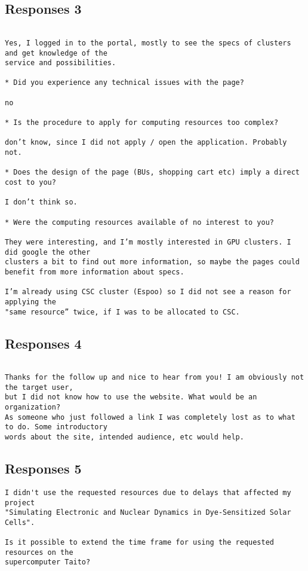 \subsection*{Responses 3}
\begin{verbatim}

Yes, I logged in to the portal, mostly to see the specs of clusters and get knowledge of the 
service and possibilities. 

* Did you experience any technical issues with the page?

no

* Is the procedure to apply for computing resources too complex?

don’t know, since I did not apply / open the application. Probably not. 

* Does the design of the page (BUs, shopping cart etc) imply a direct cost to you?

I don’t think so.

* Were the computing resources available of no interest to you?

They were interesting, and I’m mostly interested in GPU clusters. I did google the other 
clusters a bit to find out more information, so maybe the pages could 
benefit from more information about specs.

I’m already using CSC cluster (Espoo) so I did not see a reason for applying the 
"same resource” twice, if I was to be allocated to CSC. 
\end{verbatim}

\subsection*{Responses 4}
\begin{verbatim}

Thanks for the follow up and nice to hear from you! I am obviously not the target user, 
but I did not know how to use the website. What would be an organization?
As someone who just followed a link I was completely lost as to what to do. Some introductory 
words about the site, intended audience, etc would help.

\end{verbatim}

\subsection*{Responses 5}
\begin{verbatim}
I didn't use the requested resources due to delays that affected my project
"Simulating Electronic and Nuclear Dynamics in Dye-Sensitized Solar Cells".

Is it possible to extend the time frame for using the requested resources on the 
supercomputer Taito?
\end{verbatim}
